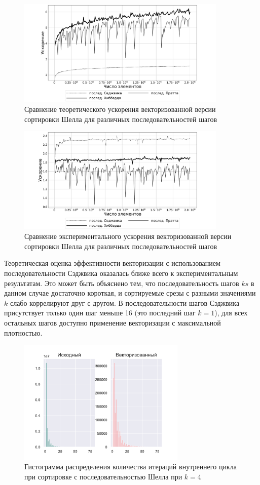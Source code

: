 \documentclass[utf8]{psta}
\begin{document}
\begin{figure}
\includegraphics[width=10cm]{pics/theoretical_eff}
\caption{Сравнение теоретического ускорения векторизованной версии сортировки Шелла для различных последовательностей шагов}
\label{pic:acc_theor}
\end{figure}

\begin{figure}
\includegraphics[width=10cm]{pics/experimental_eff}
\caption{Сравнение экспериментального ускорения векторизованной версии сортировки Шелла для различных последовательностей шагов}
\label{pic:acc_exp}
\end{figure}

Теоретическая оценка эффективности векторизации с использованием  последовательности Сэджвика оказалась ближе всего к экспериментальным результатам. Это может быть объяснено тем, что последовательность шагов $ks$ в данном случае достаточно короткая, и сортируемые срезы с разными значениями $k$ слабо коррелируют друг с другом.
В последовательности шагов Сэджвика присутствует только один шаг меньше 16 (это последний шаг $k = 1$), для всех остальных шагов доступно применение векторизации с максимальной плотностью.

\begin{figure}
\includegraphics[width=8cm,height=6cm]{pics/pic_shell_k_4}
\caption{Гистограмма распределения количества итераций внутреннего цикла при сортировке с последовательностью Шелла при $k = 4$}
\label{pic:shell_k_4}
\end{figure}
\end{document}
